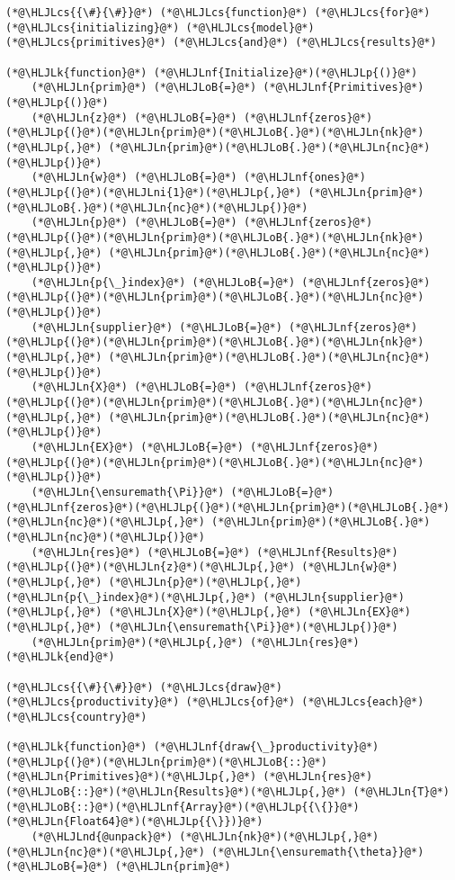 \documentclass[12pt,a4paper]{article}
\newcommand{\HLJLk}[1]{\textcolor[RGB]{148,91,176}{\textbf{#1}}}
\newcommand{\HLJLn}[1]{#1}
\newcommand{\HLJLnd}[1]{\textcolor[RGB]{214,102,97}{#1}}
\newcommand{\HLJLnf}[1]{\textcolor[RGB]{66,102,213}{#1}}
\newcommand{\HLJLni}[1]{\textcolor[RGB]{59,151,46}{#1}}
\newcommand{\HLJLoB}[1]{\textcolor[RGB]{102,102,102}{\textbf{#1}}}
\newcommand{\HLJLp}[1]{#1}
\newcommand{\HLJLcs}[1]{\textcolor[RGB]{153,153,119}{\textit{#1}}}
\begin{document}
\begin{lstlisting}
(*@\HLJLcs{{\#}{\#}}@*) (*@\HLJLcs{function}@*) (*@\HLJLcs{for}@*) (*@\HLJLcs{initializing}@*) (*@\HLJLcs{model}@*) (*@\HLJLcs{primitives}@*) (*@\HLJLcs{and}@*) (*@\HLJLcs{results}@*)

(*@\HLJLk{function}@*) (*@\HLJLnf{Initialize}@*)(*@\HLJLp{()}@*)
    (*@\HLJLn{prim}@*) (*@\HLJLoB{=}@*) (*@\HLJLnf{Primitives}@*)(*@\HLJLp{()}@*)
    (*@\HLJLn{z}@*) (*@\HLJLoB{=}@*) (*@\HLJLnf{zeros}@*)(*@\HLJLp{(}@*)(*@\HLJLn{prim}@*)(*@\HLJLoB{.}@*)(*@\HLJLn{nk}@*)(*@\HLJLp{,}@*) (*@\HLJLn{prim}@*)(*@\HLJLoB{.}@*)(*@\HLJLn{nc}@*)(*@\HLJLp{)}@*)
    (*@\HLJLn{w}@*) (*@\HLJLoB{=}@*) (*@\HLJLnf{ones}@*)(*@\HLJLp{(}@*)(*@\HLJLni{1}@*)(*@\HLJLp{,}@*) (*@\HLJLn{prim}@*)(*@\HLJLoB{.}@*)(*@\HLJLn{nc}@*)(*@\HLJLp{)}@*)
    (*@\HLJLn{p}@*) (*@\HLJLoB{=}@*) (*@\HLJLnf{zeros}@*)(*@\HLJLp{(}@*)(*@\HLJLn{prim}@*)(*@\HLJLoB{.}@*)(*@\HLJLn{nk}@*)(*@\HLJLp{,}@*) (*@\HLJLn{prim}@*)(*@\HLJLoB{.}@*)(*@\HLJLn{nc}@*)(*@\HLJLp{)}@*)
    (*@\HLJLn{p{\_}index}@*) (*@\HLJLoB{=}@*) (*@\HLJLnf{zeros}@*)(*@\HLJLp{(}@*)(*@\HLJLn{prim}@*)(*@\HLJLoB{.}@*)(*@\HLJLn{nc}@*)(*@\HLJLp{)}@*)
    (*@\HLJLn{supplier}@*) (*@\HLJLoB{=}@*) (*@\HLJLnf{zeros}@*)(*@\HLJLp{(}@*)(*@\HLJLn{prim}@*)(*@\HLJLoB{.}@*)(*@\HLJLn{nk}@*)(*@\HLJLp{,}@*) (*@\HLJLn{prim}@*)(*@\HLJLoB{.}@*)(*@\HLJLn{nc}@*)(*@\HLJLp{)}@*)
    (*@\HLJLn{X}@*) (*@\HLJLoB{=}@*) (*@\HLJLnf{zeros}@*)(*@\HLJLp{(}@*)(*@\HLJLn{prim}@*)(*@\HLJLoB{.}@*)(*@\HLJLn{nc}@*)(*@\HLJLp{,}@*) (*@\HLJLn{prim}@*)(*@\HLJLoB{.}@*)(*@\HLJLn{nc}@*)(*@\HLJLp{)}@*)
    (*@\HLJLn{EX}@*) (*@\HLJLoB{=}@*) (*@\HLJLnf{zeros}@*)(*@\HLJLp{(}@*)(*@\HLJLn{prim}@*)(*@\HLJLoB{.}@*)(*@\HLJLn{nc}@*)(*@\HLJLp{)}@*)
    (*@\HLJLn{\ensuremath{\Pi}}@*) (*@\HLJLoB{=}@*) (*@\HLJLnf{zeros}@*)(*@\HLJLp{(}@*)(*@\HLJLn{prim}@*)(*@\HLJLoB{.}@*)(*@\HLJLn{nc}@*)(*@\HLJLp{,}@*) (*@\HLJLn{prim}@*)(*@\HLJLoB{.}@*)(*@\HLJLn{nc}@*)(*@\HLJLp{)}@*)
    (*@\HLJLn{res}@*) (*@\HLJLoB{=}@*) (*@\HLJLnf{Results}@*)(*@\HLJLp{(}@*)(*@\HLJLn{z}@*)(*@\HLJLp{,}@*) (*@\HLJLn{w}@*)(*@\HLJLp{,}@*) (*@\HLJLn{p}@*)(*@\HLJLp{,}@*) (*@\HLJLn{p{\_}index}@*)(*@\HLJLp{,}@*) (*@\HLJLn{supplier}@*)(*@\HLJLp{,}@*) (*@\HLJLn{X}@*)(*@\HLJLp{,}@*) (*@\HLJLn{EX}@*)(*@\HLJLp{,}@*) (*@\HLJLn{\ensuremath{\Pi}}@*)(*@\HLJLp{)}@*)
    (*@\HLJLn{prim}@*)(*@\HLJLp{,}@*) (*@\HLJLn{res}@*)
(*@\HLJLk{end}@*)

(*@\HLJLcs{{\#}{\#}}@*) (*@\HLJLcs{draw}@*) (*@\HLJLcs{productivity}@*) (*@\HLJLcs{of}@*) (*@\HLJLcs{each}@*) (*@\HLJLcs{country}@*)

(*@\HLJLk{function}@*) (*@\HLJLnf{draw{\_}productivity}@*)(*@\HLJLp{(}@*)(*@\HLJLn{prim}@*)(*@\HLJLoB{::}@*)(*@\HLJLn{Primitives}@*)(*@\HLJLp{,}@*) (*@\HLJLn{res}@*)(*@\HLJLoB{::}@*)(*@\HLJLn{Results}@*)(*@\HLJLp{,}@*) (*@\HLJLn{T}@*)(*@\HLJLoB{::}@*)(*@\HLJLnf{Array}@*)(*@\HLJLp{{\{}}@*)(*@\HLJLn{Float64}@*)(*@\HLJLp{{\}})}@*)
    (*@\HLJLnd{@unpack}@*) (*@\HLJLn{nk}@*)(*@\HLJLp{,}@*) (*@\HLJLn{nc}@*)(*@\HLJLp{,}@*) (*@\HLJLn{\ensuremath{\theta}}@*) (*@\HLJLoB{=}@*) (*@\HLJLn{prim}@*)


\end{lstlisting}
\end{document}
